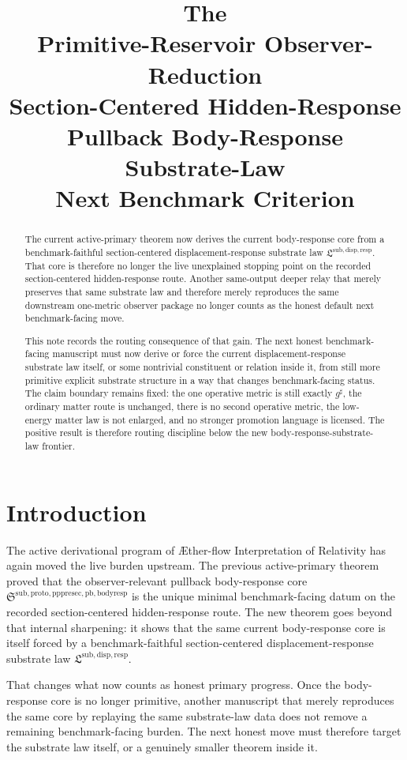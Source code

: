 \documentclass[11pt]{article}
\title{\textbf{The \TheoryName{}}\\[0.4em]
\large Primitive-Reservoir Observer-Reduction\\
\large Section-Centered Hidden-Response\\
\large Pullback Body-Response Substrate-Law\\
\large Next Benchmark Criterion}
\author{}
\date{}
\newcommand{\Aflow}{\AE{}ther-flow}
\newcommand{\TheoryName}{\Aflow{} Interpretation of Relativity}
\newcommand{\CompletedMetric}{g^{\sharp}}
\newcommand{\PullbackBodyResponseCore}{\mathfrak S^{\mathrm{sub,proto,pppresec,pb,bodyresp}}}
\newcommand{\SubstrateLaw}{\mathfrak L^{\mathrm{sub,disp,resp}}}
\begin{document}
\maketitle

\begin{abstract}
The current active-primary theorem now derives the current body-response core from a benchmark-faithful section-centered displacement-response substrate law \(\SubstrateLaw\). That core is therefore no longer the live unexplained stopping point on the recorded section-centered hidden-response route. Another same-output deeper relay that merely preserves that same substrate law and therefore merely reproduces the same downstream one-metric observer package no longer counts as the honest default next benchmark-facing move.

This note records the routing consequence of that gain. The next honest benchmark-facing manuscript must now derive or force the current displacement-response substrate law itself, or some nontrivial constituent or relation inside it, from still more primitive explicit substrate structure in a way that changes benchmark-facing status. The claim boundary remains fixed: the one operative metric is still exactly \(\CompletedMetric\), the ordinary matter route is unchanged, there is no second operative metric, the low-energy matter law is not enlarged, and no stronger promotion language is licensed. The positive result is therefore routing discipline below the new body-response-substrate-law frontier.
\end{abstract}

\section{Introduction}

The active derivational program of \TheoryName{} has again moved the live burden upstream. The previous active-primary theorem proved that the observer-relevant pullback body-response core \(\PullbackBodyResponseCore\) is the unique minimal benchmark-facing datum on the recorded section-centered hidden-response route. The new theorem goes beyond that internal sharpening: it shows that the same current body-response core is itself forced by a benchmark-faithful section-centered displacement-response substrate law \(\SubstrateLaw\).

That changes what now counts as honest primary progress. Once the body-response core is no longer primitive, another manuscript that merely reproduces the same core by replaying the same substrate-law data does not remove a remaining benchmark-facing burden. The next honest move must therefore target the substrate law itself, or a genuinely smaller theorem inside it.
\end{document}
